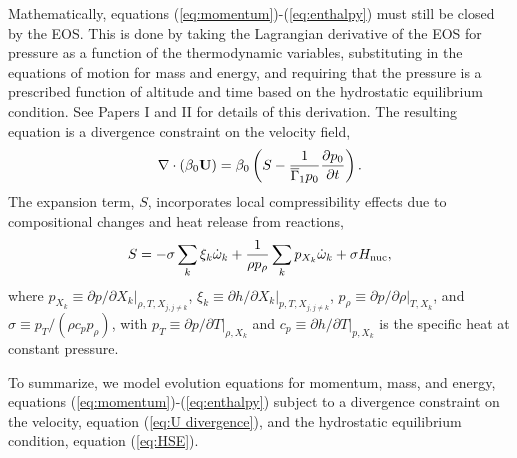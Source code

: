 Mathematically, equations (\ref{eq:momentum})-(\ref{eq:enthalpy}) must still be closed by the EOS.
This is done by taking the Lagrangian derivative of the EOS for pressure as a function of the thermodynamic variables,
substituting in the equations of motion for mass and energy,
and requiring that the pressure is a prescribed function of altitude and time based on the hydrostatic equilibrium condition.
See Papers I and II for details of this derivation.
The resulting equation is a divergence constraint on the velocity field,
\begin{equation}
\nabla\cdot(\beta_0\Ub) = \beta_0\left(S - \frac{1}{\gammaonebar p_0}\frac{\partial p_0}{\partial t}\right).\label{eq:U divergence}
\end{equation}
The expansion term, $S$, incorporates local compressibility effects due to compositional changes and heat release from reactions,
\begin{equation}
S = -\sigma\sum_k\xi_k\omegadot_k + \frac{1}{\rho p_\rho}\sum_k p_{X_k}\omegadot_k + \sigma\Hnuc,\label{eq:S}
\end{equation}
where
$p_{X_k} \equiv \left. \partial p / \partial X_k \right|_{\rho,T,X_{j,j\ne k}}$,
$\xi_k \equiv \left. \partial h /\partial X_k \right |_{p,T,X_{j,j\ne k}}$,
$p_\rho \equiv \left.\partial p/\partial \rho \right |_{T, X_k}$, and
$\sigma \equiv p_T/(\rho c_p p_\rho)$, with $p_T \equiv \left. \partial p / \partial
T \right|_{\rho, X_k}$ and $c_p \equiv \left.  \partial h / \partial T
\right|_{p,X_k}$ is the specific heat at constant pressure.

To summarize, we model evolution equations for momentum, mass, and energy, equations (\ref{eq:momentum})-(\ref{eq:enthalpy}) subject to a divergence constraint on the velocity, equation (\ref{eq:U divergence}), and the hydrostatic equilibrium condition, equation (\ref{eq:HSE}).
